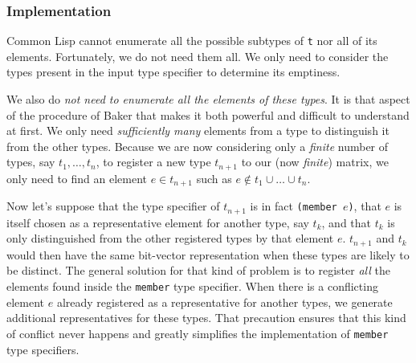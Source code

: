 \documentclass[format=sigconf]{acmart}
\newcommand\code[2][\small]{\sloppy\texttt{#1#2}}
\theoremstyle{definition}
\begin{document}


\subsubsection{Implementation}
Common Lisp cannot enumerate all the possible subtypes of \code{t} nor all of
its elements. Fortunately, we do not need them all. We only need to consider the
types present in the input type specifier to determine its emptiness.

We also do \emph{not need to enumerate all the elements of these types}.
It is that aspect of the procedure of Baker that makes it both powerful and
difficult to understand at first. We only need \emph{sufficiently many} elements
from a type to distinguish it from the other types.
Because we are now considering only a \emph{finite} number of types, say $t_1,
\dots, t_n$, to register a new type $t_{n+1}$ to our (now \emph{finite}) matrix,
we only need to find an element $e \in t_{n+1}$ such as $e \notin t_1 \cup \dots
\cup t_n$.

Now let's suppose that the type specifier of $t_{n+1}$ is in fact \code{(member
  $e$)}, that $e$ is itself chosen as a representative element for another type,
say $t_k$, and that $t_k$ is only distinguished from the other registered types
by that element $e$. $t_{n+1}$ and $t_k$ would then have the same bit-vector
representation when these types are likely to be distinct. The general solution
for that kind of problem is to register \emph{all} the elements found inside the
\code{member} type specifier. When there is a conflicting element $e$ already
registered as a representative for another types, we generate additional
representatives for these types. That precaution ensures that this kind of
conflict never happens and greatly simplifies the implementation of \code{member}
type specifiers.
\end{document}
